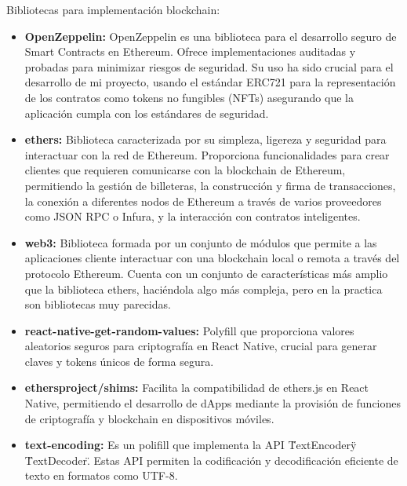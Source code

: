 Bibliotecas para implementación blockchain:
\begin{itemize}

\item \textbf{OpenZeppelin:} OpenZeppelin es una biblioteca para el desarrollo seguro de Smart Contracts en Ethereum. Ofrece implementaciones auditadas y probadas para minimizar riesgos de seguridad.
Su uso ha sido crucial para el desarrollo de mi proyecto, usando el estándar ERC721 para la representación de los contratos como tokens no fungibles (NFTs) asegurando que la aplicación cumpla con los estándares de seguridad.

\item \textbf{ethers:} Biblioteca caracterizada por su simpleza, ligereza y seguridad para interactuar con la red de Ethereum. Proporciona funcionalidades para crear clientes que requieren comunicarse con la blockchain de Ethereum, permitiendo la gestión de billeteras, la construcción y firma de transacciones, la conexión a diferentes nodos de Ethereum a través de varios proveedores como JSON RPC o Infura, y la interacción con contratos inteligentes.

\item \textbf{web3:} Biblioteca formada por un conjunto de módulos que permite a las aplicaciones cliente interactuar con una blockchain local o remota a través del protocolo Ethereum. 
Cuenta con un conjunto de características más amplio que la biblioteca ethers, haciéndola algo más compleja, pero en la practica son bibliotecas muy parecidas.

\item \textbf{react-native-get-random-values:} Polyfill que proporciona valores aleatorios seguros para criptografía en React Native, crucial para generar claves y tokens únicos de forma segura.

\item \textbf{ethersproject/shims:} Facilita la compatibilidad de ethers.js en React Native, permitiendo el desarrollo de dApps mediante la provisión de funciones de criptografía y blockchain en dispositivos móviles.

\item \textbf{text-encoding:} Es un polifill que implementa la API \"TextEncoder\" y \"TextDecoder\". Estas API permiten la codificación y decodificación eficiente de texto en formatos como UTF-8.

\end{itemize}


